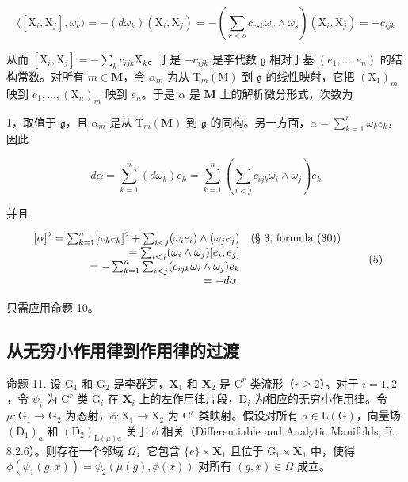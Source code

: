 \[
\langle [ \mathrm{X} _ {i}, \mathrm{X} _ {j} ], \omega_ {k} \rangle = - (d \omega_ {k}) (\mathrm{X} _ {i}, \mathrm{X} _ {j}) = - \left(\sum_ {r <   s} c _ {r s k} \omega_ {r} \wedge \omega_ {s}\right) (\mathrm{X} _ {i}, \mathrm{X} _ {j}) = - c _ {i j k}
\]

从而 \([\mathrm{X}_i,\mathrm{X}_j] = -\sum_{k}c_{ijk}\mathrm{X}_k\)。于是 \(-c_{ijk}\) 是李代数 \(\mathfrak{g}\) 相对于基 \((e_1,\dots ,e_n)\) 的结构常数。对所有 \(m\in \mathbf{M}\)，令 \(\alpha_{m}\) 为从 \(\mathrm{T}_{m}(\mathrm{M})\) 到 \(\mathfrak{g}\) 的线性映射，它把 \((\mathrm{X}_1)_m\) 映到 \(e_1,\ldots ,(\mathrm{X}_n)_m\) 映到 \(e_n\)。于是 \(\alpha\) 是 \(\mathbf{M}\) 上的解析微分形式，次数为

1，取值于 \(\mathfrak{g}\)，且 \(\alpha_{m}\) 是从 \(\mathrm{T}_m(\mathbf{M})\) 到 \(\mathfrak{g}\) 的同构。另一方面，\(\alpha = \sum_{k=1}^{n} \omega_k e_k\)，因此

\[
d \alpha = \sum_ {k = 1} ^ {n} (d \omega_ {k}) e _ {k} = \sum_ {k = 1} ^ {n} \left(\sum_ {i <   j} c _ {i j k} \omega_ {i} \wedge \omega_ {j}\right) e _ {k}
\]

并且

\[
\begin{array}{r l} {[ \alpha ] ^ {2} = \sum_ {k = 1} ^ {n} [ \omega_ {k} e _ {k} ] ^ {2} + \sum_ {i <   j} (\omega_ {i} e _ {i}) \wedge (\omega_ {j} e _ {j})} & {\text {(§ 3, formula (30))}} \\ {= \sum_ {i <   j} (\omega_ {i} \wedge \omega _ {j}) [ e _ {i}, e _ {j} ]} \\ {= - \sum_ {k = 1} ^ {n} \sum_ {i <   j} (c _ {i j k} \omega_ {i} \wedge \omega_ {j}) e _ {k}} \\ {= - d \alpha.} \end{array}\tag{5}
\]

只需应用命题 10。

\subsection{从无穷小作用律到作用律的过渡}

命题 11. 设 \(\mathrm{G}_1\) 和 \(\mathrm{G}_2\) 是李群芽，\(\mathbf{X}_1\) 和 \(\mathbf{X}_2\) 是 \(\mathrm{C}^r\) 类流形（\(r \geqslant 2\)）。对于 \(i = 1, 2\)，令 \(\psi_i\) 为 \(\mathrm{C}^r\) 类 \(\mathrm{G}_i\) 在 \(\mathbf{X}_i\) 上的左作用律片段，\(\mathrm{D}_i\) 为相应的无穷小作用律。令 \(\mu: \mathrm{G}_1 \to \mathrm{G}_2\) 为态射，\(\phi: \mathrm{X}_1 \to \mathrm{X}_2\) 为 \(\mathrm{C}^r\) 类映射。假设对所有 \(a \in \mathrm{L}(\mathrm{G})\)，向量场 \((\mathrm{D}_{1})_a\) 和 \((\mathrm{D}_{2})_{\mathrm{L}(\mu)a}\) 关于 \(\phi\) 相关（Differentiable and Analytic Manifolds, R, 8.2.6）。则存在一个邻域 \(\Omega\)，它包含 \(\{e\} \times \mathbf{X}_1\) 且位于 \(\mathrm{G}_1 \times \mathbf{X}_1\) 中，使得 \(\phi(\psi_1(g,x)) = \psi_2(\mu(g),\phi(x))\) 对所有 \((g,x) \in \Omega\) 成立。

